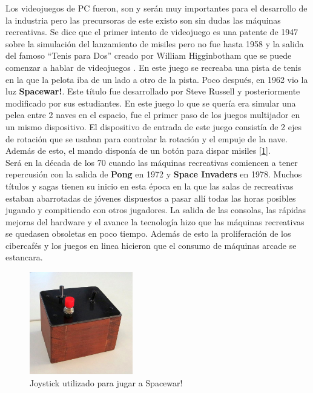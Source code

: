 Los videojuegos de PC fueron, son y ser\'an muy importantes para el desarrollo de la industria pero las precursoras de este existo son sin dudas las m\'aquinas recreativas. Se dice que el primer intento de videojuego es una patente de 1947 sobre la simulaci\'on del lanzamiento de misiles pero no fue hasta 1958 y la salida del famoso ``Tenis para Dos'' creado por William Higginbotham que se puede comenzar a hablar de videojuegos \citep{tenispara2}. En este juego se recreaba una pista de tenis en la que la pelota iba de un lado a otro de la pista. Poco despu\'es, en 1962 vio la luz \textbf{Spacewar!}. Este t\'itulo fue desarrollado por Steve Russell y posteriormente modificado por sus estudiantes. En este juego lo que se quer\'ia era simular una pelea entre 2 naves en el espacio, fue el primer paso de los juegos multijador en un mismo dispositivo. El dispositivo de entrada de este juego consist\'ia de 2 ejes de rotaci\'on que se usaban para controlar la rotaci\'on y el empuje de la nave. Adem\'as de esto, el mando dispon\'ia de un bot\'on para dispar misiles [\ref{Fig:spacewar}].\\

Ser\'a en la d\'ecada de los 70 cuando las m\'aquinas recreativas comiencen a tener repercusi\'on con la salida de \textbf{Pong} en 1972 y \textbf{Space Invaders} en 1978. Muchos t\'itulos y sagas tienen su inicio en esta \'epoca en la que las salas de recreativas estaban abarrotadas de j\'ovenes dispuestos a pasar all\'i todas las horas posibles jugando y compitiendo con otros jugadores. La salida de las consolas, las r\'apidas mejoras del hardware y el avance la tecnolog\'ia hizo que las m\'aquinas recreativas se quedasen obsoletas en poco tiempo. Adem\'as de esto la proliferaci\'on de los cibercaf\'es y los juegos en linea hicieron que el consumo de m\'aquinas arcade se estancara. \\

\begin{figure}[h]
\centering
\includegraphics[width=0.4\textwidth]{./Imagenes/Bitmap/spacewar-controller.jpg}
\caption{Joystick utilizado para jugar a Spacewar!}
\label{Fig:spacewar}
\end{figure}

